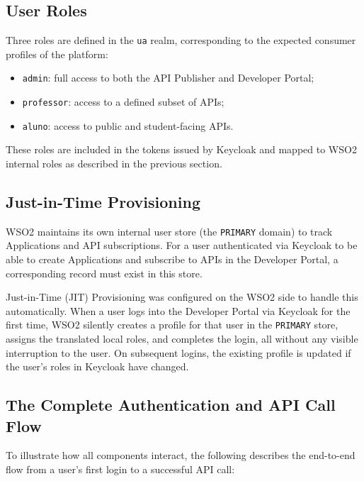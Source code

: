 \documentclass[12pt, a4paper]{report}
\begin{document}
\subsection{User Roles}
Three roles are defined in the \texttt{ua} realm, corresponding to the expected consumer
profiles of the platform:
\begin{itemize}
      \item \texttt{admin}: full access to both the API Publisher and Developer Portal;
      \item \texttt{professor}: access to a defined subset of APIs;
      \item \texttt{aluno}: access to public and student-facing APIs.
\end{itemize}
These roles are included in the tokens issued by Keycloak and mapped to WSO2 internal
roles as described in the previous section.

\subsection{Just-in-Time Provisioning}
\label{sec:keycloak_jit}
WSO2 maintains its own internal user store (the \texttt{PRIMARY} domain) to track
Applications and API subscriptions. For a user authenticated via Keycloak to be able to
create Applications and subscribe to APIs in the Developer Portal, a corresponding record
must exist in this store.

Just-in-Time (JIT) Provisioning was configured on the WSO2 side to handle this
automatically. When a user logs into the Developer Portal via Keycloak for the first time,
WSO2 silently creates a profile for that user in the \texttt{PRIMARY} store, assigns the
translated local roles, and completes the login, all without any visible interruption
to the user. On subsequent logins, the existing profile is updated if the user's roles in
Keycloak have changed.

\subsection{The Complete Authentication and API Call Flow}
To illustrate how all components interact, the following describes the end-to-end flow
from a user's first login to a successful API call:
\end{document}
